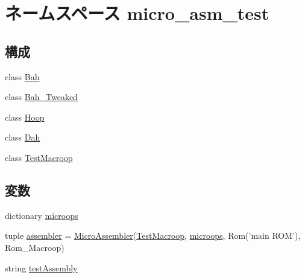 \hypertarget{namespacemicro__asm__test}{
\section{ネームスペース micro\_\-asm\_\-test}
\label{namespacemicro__asm__test}
}
\subsection*{構成}
\begin{DoxyCompactItemize}
\item 
class \hyperlink{classmicro__asm__test_1_1Bah}{Bah}
\item 
class \hyperlink{classmicro__asm__test_1_1Bah__Tweaked}{Bah\_\-Tweaked}
\item 
class \hyperlink{classmicro__asm__test_1_1Hoop}{Hoop}
\item 
class \hyperlink{classmicro__asm__test_1_1Dah}{Dah}
\item 
class \hyperlink{classmicro__asm__test_1_1TestMacroop}{TestMacroop}
\end{DoxyCompactItemize}
\subsection*{変数}
\begin{DoxyCompactItemize}
\item 
dictionary \hyperlink{namespacemicro__asm__test_ab606ba888b0a7ffba69d1166a36fba58}{microops}
\item 
tuple \hyperlink{namespacemicro__asm__test_a74c95ea135aaf952aafb757531325188}{assembler} = \hyperlink{classmicro__asm_1_1MicroAssembler}{MicroAssembler}(\hyperlink{classmicro__asm__test_1_1TestMacroop}{TestMacroop}, \hyperlink{namespacemicro__asm__test_ab606ba888b0a7ffba69d1166a36fba58}{microops}, Rom('main ROM'), Rom\_\-Macroop)
\item 
string \hyperlink{namespacemicro__asm__test_a24df19f1ed186263dd123a909e9c55dc}{testAssembly}
\end{DoxyCompactItemize}


